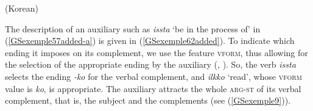 {%
\ea 
\label{GSexemple57}
 (Korean) \impl \\
\z


The description of an auxiliary such as \emph{issta} `be in the process of' in (\ref{GSexemple57added-a}) is given in (\ref{GSexemple62added}). To indicate which ending it imposes on its complement, we use the feature \textsc{vform}, thus allowing for the selection of the appropriate ending by the auxiliary (\citealt{Chung98a-u}, \citealt{Kim2016a-u}). So, the verb \emph{issta} selects the ending \emph{-ko} for the verbal complement, and \emph{ilkko} `read', whose \textsc{vform} value is \emph{ko}, is appropriate. The auxiliary attracts the whole \textsc{arg-st} of its verbal complement, that is, the subject  and the complements  (see (\ref{GSexemple9})). 

\begin{exe}
    \label{GSexemple62added}
\end{exe}



}
